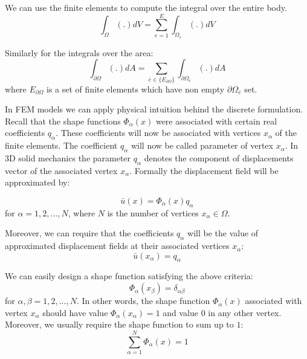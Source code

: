 \documentclass[en]{minipw} %
\begin{document}
We can use the finite elements to compute the integral over the entire body.
\begin{equation}
\int_{\Omega} (.) dV = \sum^{E}_{e=1} \int_{\Omega_{e}}(.) dV
\end{equation}

Similarly for the integrals over the area:
\begin{equation}
\int_{\partial \Omega} (.) dA = \sum_{\bar{e} \in \{ E_{\partial \Omega} \}} \int_{\partial \Omega_{\bar{e}}}(.) dA
\end{equation}
where $E_{\partial \Omega}$ is a set of finite elements which have non empty $\partial \Omega_{\bar{e}}$ set.

In FEM models we can apply physical intuition behind the discrete formulation. Recall that the shape functions $\Phi_{\alpha}(x)$ were associated with certain real coefficients $q_{\alpha}$. These coefficients will now be associated with vertices $x_{\alpha}$ of the finite elements. The coefficient $q_{\alpha}$ will now be called parameter of vertex $x_{\alpha}$. In 3D solid mechanics the parameter  $q_{\alpha}$ denotes the component of displacements vector of the associated vertex $x_{\alpha}$. Formally the displacement field will be approximated by:

\begin{equation}
\bar{u}(x) = \Phi_{\alpha}(x)q_{\alpha}
\end{equation}
for $\alpha = 1,2,...,N$, where $N$ is the number of vertices $x_{\alpha} \in \Omega$.

Moreover, we can require that the coefficients $q_{\alpha}$ will be the value of approximated displacement fields at their associated vertices $x_{\alpha}$:
\begin{equation}
\bar{u}(x_{\alpha}) = q_{\alpha}
\end{equation}

We can easily design a shape function satisfying the above criteria:
\begin{equation}
\Phi_{\alpha}(x_{\beta}) = \delta_{\alpha \beta}
\end{equation}
for $\alpha , \beta = 1,2,...,N$. In other words, the shape function $\Phi_{\alpha}(x)$ associated with vertex $x_{\alpha}$ should have value $\Phi_{\alpha}(x_{\alpha}) = 1$ and value $0$ in any other vertex. 
Moreover, we usually require the shape function to sum up to $1$:
\begin{equation}
\sum^{N}_{\alpha = 1}\Phi_{\alpha}(x) = 1
\end{equation}
\end{document}
